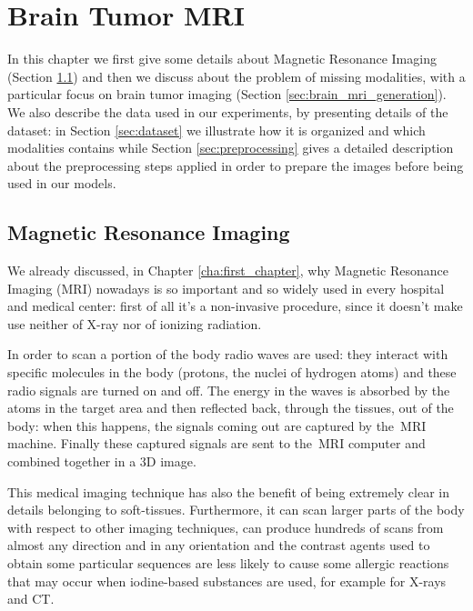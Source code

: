 \chapter{Brain Tumor MRI}
\label{cha:3rd_chapter}
In this chapter we first give some details about Magnetic Resonance Imaging (Section \ref{sec:mri}) and then we discuss about the problem of missing modalities, with a particular focus on brain tumor imaging (Section \ref{sec:brain_mri_generation}). We also describe the data used in our experiments, by presenting details of the dataset: in Section \ref{sec:dataset} we illustrate how it is organized and which modalities contains while Section \ref{sec:preprocessing} gives a detailed description about the preprocessing steps applied in order to prepare the images before being used in our models.


\section{Magnetic Resonance Imaging}
\label{sec:mri}
We already discussed, in Chapter \ref{cha:first_chapter}, why Magnetic Resonance Imaging (\ac{MRI}) nowadays is so important and so widely used in every hospital and medical center: first of all it's a non-invasive procedure, since it doesn't make use neither of X-ray nor of ionizing radiation. 

In order to scan a portion of the body radio waves are used: they interact with specific molecules in the body (protons, the nuclei of hydrogen atoms) and these radio signals are turned on and off. The energy in the waves is absorbed by the atoms in the target area and then reflected back, through the tissues, out of the body: when this happens, the signals coming out are captured by the~\ac{MRI} machine. Finally these captured signals are sent to the~\ac{MRI} computer and combined together in a 3D image. 

\vspace{2mm} %
This medical imaging technique has also the benefit of being extremely clear in details belonging to soft-tissues. Furthermore, it can scan larger parts of the body with respect to other imaging techniques, can produce hundreds of scans from almost any direction and in any orientation and the contrast agents used to obtain some particular sequences are less likely to cause some allergic reactions that may occur when iodine-based substances are used, for example for X-rays and CT\cite{mri_benefits}.

